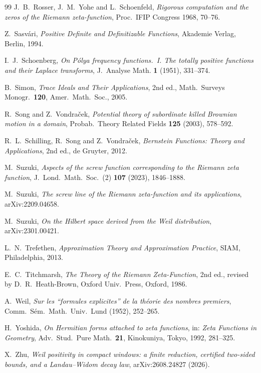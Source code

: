 \documentclass[11pt]{amsart}
\theoremstyle{definition}
\theoremstyle{remark}
\begin{document}
\begin{thebibliography}{99}
 J.~B.~Rosser, J.~M.~Yohe and L.~Schoenfeld, \emph{Rigorous computation and
the zeros of the Riemann zeta-function}, Proc.\ IFIP Congress 1968, 70--76.

 Z.~Sasv\'ari, \emph{Positive Definite and Definitizable Functions},
Akademie Verlag, Berlin, 1994.

 I.~J.~Schoenberg, \emph{On P\'olya frequency functions.~I. The
totally positive functions and their Laplace transforms}, J.~Analyse Math. \textbf{1} (1951), 331--374.

 B.~Simon, \emph{Trace Ideals and Their Applications}, 2nd ed., Math.\ Surveys Monogr.\ \textbf{120}, Amer.~Math.~Soc., 2005.

 R.~Song and Z.~Vondra\v{c}ek, \emph{Potential theory of subordinate
killed Brownian motion in a domain}, Probab.~Theory Related Fields \textbf{125} (2003), 578--592.

 R.~L.~Schilling, R.~Song and Z.~Vondra\v{c}ek, \emph{Bernstein Functions:
Theory and Applications}, 2nd ed., de Gruyter, 2012.

 M.~Suzuki, \emph{Aspects of the screw function corresponding to the
Riemann zeta function}, J.~Lond.~Math.~Soc.~(2) \textbf{107} (2023), 1846--1888.

 M.~Suzuki, \emph{The screw line of the Riemann zeta-function and
its applications}, arXiv:2209.04658.

 M.~Suzuki, \emph{On the Hilbert space derived from the Weil
distribution}, arXiv:2301.00421.

 L.~N.~Trefethen, \emph{Approximation Theory and Approximation Practice},
SIAM, Philadelphia, 2013.

 E.~C.~Titchmarsh, \emph{The Theory of the Riemann Zeta-Function}, 2nd ed., revised by D.~R.~Heath-Brown,
Oxford Univ.\ Press, Oxford, 1986.

 A.~Weil, \emph{Sur les ``formules explicites'' de la th\'eorie des nombres
premiers}, Comm.~S\'em.~Math.~Univ.~Lund (1952), 252--265.

 H.~Yoshida, \emph{On Hermitian forms attached to zeta functions}, in:
\emph{Zeta Functions in Geometry}, Adv.~Stud.~Pure Math.~\textbf{21}, Kinokuniya, Tokyo, 1992, 281--325.

 X.~Zhu, \emph{Weil positivity in compact windows: a finite reduction, certified
two-sided bounds, and a Landau--Widom decay law}, arXiv:2608.24827 (2026).

\end{thebibliography}
\end{document}
